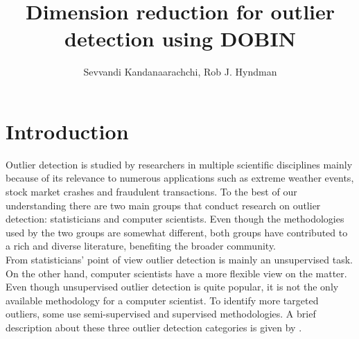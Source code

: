 \documentclass[a4paper,11pt]{article}
\begin{document}
\title{Dimension reduction for outlier detection using DOBIN}
\author{Sevvandi Kandanaarachchi, Rob J. Hyndman}
\maketitle
{}

\section{Introduction}
Outlier detection is studied by researchers in multiple scientific disciplines mainly because of its relevance to numerous applications such as extreme weather events, stock market crashes and fraudulent transactions. To the best of our understanding there are two main groups that conduct research on outlier detection:  statisticians and computer scientists. Even though the methodologies used by the two groups are somewhat different, both groups have contributed to a rich and diverse literature, benefiting the broader community. \\ 

From statisticians' point of view outlier detection is mainly an unsupervised task. On the other hand, computer scientists have a more flexible view on the matter. Even though unsupervised outlier detection is quite popular, it is not the only  available methodology for a computer scientist.  To identify more targeted outliers, some use  semi-supervised and supervised methodologies. A brief description about these three outlier detection categories is given by \cite{goldstein2016comparative}. \\
\end{document}

